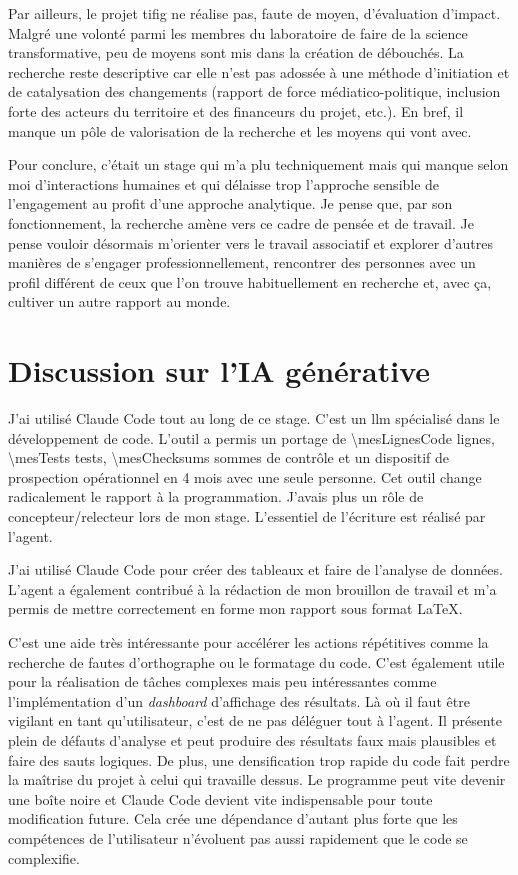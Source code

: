 Par ailleurs, le projet \gls{tifig} ne réalise pas, faute de moyen, d'évaluation d'impact.
Malgré une volonté parmi les membres du laboratoire de faire de la science transformative, peu
de moyens sont mis dans la création de débouchés. La recherche reste descriptive car elle n'est
pas adossée à une méthode d'initiation et de catalysation des changements (rapport de force
médiatico-politique, inclusion forte des acteurs du territoire et des financeurs du projet,
etc.). En bref, il manque un pôle de valorisation de la recherche et les moyens qui vont avec.

Pour conclure, c'était un stage qui m'a plu techniquement mais qui manque selon moi
d'interactions humaines et qui délaisse trop l'approche sensible de l'engagement au profit d'une
approche analytique. Je pense que, par son fonctionnement, la recherche amène vers ce cadre de
pensée et de travail. Je pense vouloir désormais m'orienter vers le travail associatif et
explorer d'autres manières de s'engager professionnellement, rencontrer des personnes avec un
profil différent de ceux que l'on trouve habituellement en recherche et, avec ça, cultiver un
autre rapport au monde.

\section{Discussion sur l'IA générative}
\label{sec:disc-ia}

J'ai utilisé Claude Code tout au long de ce stage. C'est un \gls{llm} spécialisé dans le
développement de code. L'outil a permis un portage de \num{\mesLignesCode} lignes,
\num{\mesTests} tests, \num{\mesChecksums} sommes de contrôle et un dispositif de prospection
opérationnel en \num{4} mois avec une seule personne. Cet outil change radicalement le rapport à
la programmation. J'avais plus un rôle de concepteur/relecteur lors de mon stage. L'essentiel de
l'écriture est réalisé par l'agent.

J'ai utilisé Claude Code pour créer des tableaux et faire de l'analyse de données. L'agent a
également contribué à la rédaction de mon brouillon de travail et m'a permis de mettre
correctement en forme mon rapport sous format \LaTeX.

C'est une aide très intéressante pour accélérer les actions répétitives comme la recherche
de fautes d'orthographe ou le formatage du code. C'est également utile pour la réalisation de
tâches complexes mais peu intéressantes comme l'implémentation d'un \emph{dashboard} d'affichage
des résultats. Là où il faut être vigilant en tant qu'utilisateur, c'est de ne pas déléguer tout
à l'agent. Il présente plein de défauts d'analyse et peut produire des résultats faux mais
plausibles et faire des sauts logiques. De plus, une densification trop rapide du code fait
perdre la maîtrise du projet à celui qui travaille dessus. Le programme peut vite devenir une
boîte noire et Claude Code devient vite indispensable pour toute modification future. Cela crée
une dépendance d'autant plus forte que les compétences de l'utilisateur n'évoluent pas aussi
rapidement que le code se complexifie.

